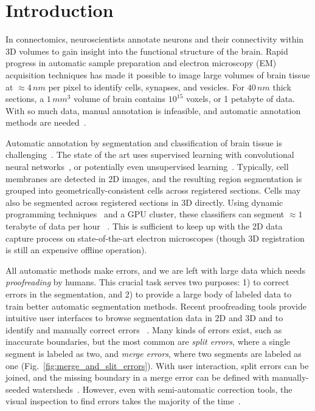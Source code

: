 \section{Introduction}

In connectomics, neuroscientists annotate neurons and their connectivity within 3D volumes to gain insight into the functional structure of the brain. Rapid progress in automatic sample preparation and electron microscopy (EM) acquisition techniques has made it possible to image large volumes of brain tissue at $\approx4\, nm$ per pixel to identify cells, synapses, and vesicles. For $40\, nm$ thick sections, a $1\, mm^3$ volume of brain contains $10^{15}$ voxels, or 1 petabyte of data. With so much data, manual annotation is infeasible, and automatic annotation methods are needed~\cite{jain2010,Liu2014,GALA2014,kaynig2015large}.

Automatic annotation by segmentation and classification of brain tissue is challenging~\cite{isbi_challenge}. The state of the art uses supervised learning with convolutional neural networks~\cite{Ciresan:2012f}, or potentially even unsupervised learning~\cite{BogovicHJ13}. Typically, cell membranes are detected in 2D images, and the resulting region segmentation is grouped into geometrically-consistent cells across registered sections. Cells may also be segmented across registered sections in 3D directly. Using dynamic programming techniques~\cite{Masci:2013a} and a GPU cluster, these classifiers can segment $\approx1$ terabyte of data per hour ~\cite{kasthuri2015saturated}. This is sufficient to keep up with the 2D data capture process on state-of-the-art electron microscopes (though 3D registration is still an expensive offline operation).

All automatic methods make errors, and we are left with large data which needs \emph{proofreading} by humans. This crucial task serves two purposes: 1) to correct errors in the segmentation, and 2) to provide a large body of labeled data to train better automatic segmentation methods. Recent proofreading tools provide intuitive user interfaces to browse segmentation data in 2D and 3D and to identify and manually correct errors ~\cite{markus_proofreading,raveler,mojo2,haehn_dojo_2014}. Many kinds of errors exist, such as inaccurate boundaries, but the most common are \emph{split errors}, where a single segment is labeled as two, and \emph{merge errors}, where two segments are labeled as one (Fig.~\ref{fig:merge_and_slit_errors}). With user interaction, split errors can be joined, and the missing boundary in a merge error can be defined with manually-seeded watersheds~\cite{haehn_dojo_2014}. However, even with semi-automatic correction tools, the visual inspection to find errors takes the majority of the time~\cite{proofreading_bottleneck}.

